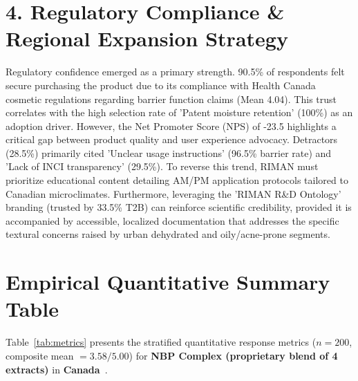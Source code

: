 \documentclass[10pt,twocolumn,a4paper]{article}
\begin{document}
\section{4. Regulatory Compliance \& Regional Expansion Strategy}
Regulatory confidence emerged as a primary strength. 90.5\% of respondents felt secure purchasing the product due to its compliance with Health Canada cosmetic regulations regarding barrier function claims (Mean 4.04). This trust correlates with the high selection rate of 'Patent moisture retention' (100\%) as an adoption driver. However, the Net Promoter Score (NPS) of -23.5 highlights a critical gap between product quality and user experience advocacy. Detractors (28.5\%) primarily cited 'Unclear usage instructions' (96.5\% barrier rate) and 'Lack of INCI transparency' (29.5\%). To reverse this trend, RIMAN must prioritize educational content detailing AM/PM application protocols tailored to Canadian microclimates. Furthermore, leveraging the 'RIMAN R\&D Ontology' branding (trusted by 33.5\% T2B) can reinforce scientific credibility, provided it is accompanied by accessible, localized documentation that addresses the specific textural concerns raised by urban dehydrated and oily/acne-prone segments.


\section{Empirical Quantitative Summary Table}
Table~\ref{tab:metrics} presents the stratified quantitative response metrics ($n = 200$, composite mean $= 3.58/5.00$) for \textbf{NBP Complex (proprietary blend of 4 extracts)} in \textbf{Canada}~\cite{ref_kaggle_doi,ref_hf_doi}.
\end{document}

